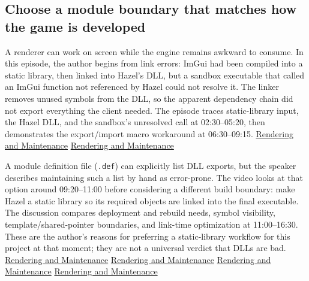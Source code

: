\subsection{Choose a module boundary that matches how the game is developed}\label{05-engine-i-ch013-choose-a-module-boundary-that-matches-how-the-game-is-developed}

A renderer can work on screen while the engine remains awkward to consume. In this episode, the author begins from link errors: ImGui had been compiled into a static library, then linked into Hazel's DLL, but a sandbox executable that called an ImGui function not referenced by Hazel could not resolve it. The linker removes unused symbols from the DLL, so the apparent dependency chain did not export everything the client needed. The episode traces static-library input, the Hazel DLL, and the sandbox's unresolved call at 02:30--05:20, then demonstrates the export/import macro workaround at 06:30--09:15. \href{https://www.youtube.com/watch?v=695SyEyFwWU&t=150s}{Rendering and Maintenance} \href{https://www.youtube.com/watch?v=695SyEyFwWU&t=390s}{Rendering and Maintenance}

A module definition file (\texttt{.def}) can explicitly list DLL exports, but the speaker describes maintaining such a list by hand as error-prone. The video looks at that option around 09:20--11:00 before considering a different build boundary: make Hazel a static library so its required objects are linked into the final executable. The discussion compares deployment and rebuild needs, symbol visibility, template/shared-pointer boundaries, and link-time optimization at 11:00--16:30. These are the author's reasons for preferring a static-library workflow for this project at that moment; they are not a universal verdict that DLLs are bad. \href{https://www.youtube.com/watch?v=695SyEyFwWU&t=550s}{Rendering and Maintenance} \href{https://www.youtube.com/watch?v=695SyEyFwWU&t=660s}{Rendering and Maintenance} \href{https://www.youtube.com/watch?v=695SyEyFwWU&t=780s}{Rendering and Maintenance} \href{https://www.youtube.com/watch?v=695SyEyFwWU&t=930s}{Rendering and Maintenance}

